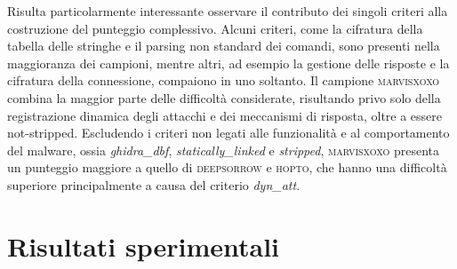 Risulta particolarmente interessante osservare il contributo dei singoli criteri alla costruzione del punteggio complessivo. Alcuni criteri, come la cifratura della tabella delle stringhe e il parsing non standard dei comandi, sono presenti nella maggioranza dei campioni, mentre altri, ad esempio la gestione delle risposte e la cifratura della connessione, compaiono in uno soltanto. Il campione \textsc{marvisxoxo} combina la maggior parte delle difficoltà considerate, risultando privo solo della registrazione dinamica degli attacchi e dei meccanismi di risposta, oltre a essere not-stripped. Escludendo i criteri non legati alle funzionalità e al comportamento del malware, ossia \emph{ghidra\_dbf}, \emph{statically\_linked} e \emph{stripped}, \textsc{marvisxoxo} presenta un punteggio maggiore a quello di \textsc{deepsorrow} e \textsc{hopto}, che hanno una difficoltà superiore principalmente a causa del criterio \emph{dyn\_att}.



\section{Risultati sperimentali}  %

